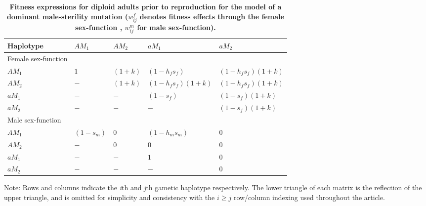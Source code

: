 \documentclass[9pt,twocolumn,twoside,lineno]{gsajnl}
\begin{document}
\begin{table*}[htbp]
\centering
\caption{\bf Fitness expressions for diploid adults prior to reproduction for the model of a dominant male-sterility mutation ($w^f_{ij}$ denotes fitness effects through the female sex-function , $w^m_{ij}$ for male sex-function).}
\begin{tableminipage}{\textwidth}
\begin{tabularx}{\textwidth}{XXXXX}
\hline
Haplotype & $ AM_1$ & $ AM_2$ & $ aM_1$ & $ aM_2$ \\
\hline
Female sex-function & & & & \\
$ AM_1$ & $1$ & $(1 + k)$ & $(1 - h_f s_f)$        & $(1 - h_f s_f)(1 + k)$ \\
$ AM_2$ & $-$ & $(1 + k)$ & $(1 - h_f s_f)(1 + k)$ & $(1 - h_f s_f)(1 + k)$ \\
$ aM_1$ & $-$ & $-$       & $(1 - s_f)$            & $(1 - s_f)(1 + k)$ \\
$ aM_2$ & $-$ & $-$       & $-$                    & $(1 - s_f)(1 + k)$ \\
Male sex-function & & & & \\
$ AM_1$ & $(1 - s_m)$ & $0$ & $(1 - h_m s_m)$ & $0$ \\
$ AM_2$ & $-$         & $0$ & $0$             & $0$ \\
$ aM_1$ & $-$         & $-$ & $1$             & $0$ \\
$ aM_2$ & $-$         & $-$ & $-$             & $0$ \\
\hline
\end{tabularx}
  \label{tab:fitness}
\end{tableminipage}
{\footnotesize Note: Rows and columns indicate the \textit{i}th and \textit{j}th gametic haplotype respectively. The lower triangle of each matrix is the reflection of the upper triangle, and is omitted for simplicity and consistency with the $i \geq j$ row/column indexing used throughout the article.}
\end{table*}
\end{document}
